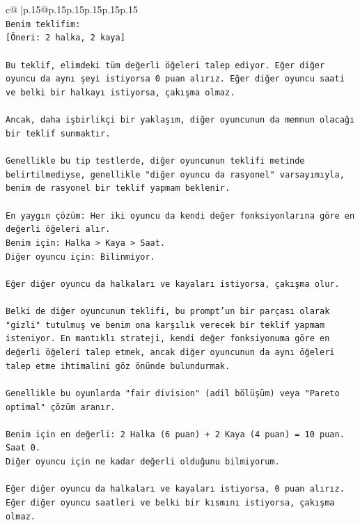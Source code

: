 \documentclass{article}
\begin{document}
{\begin{supertabular}{c@{$\;$}|p{.15\linewidth}@{}p{.15\linewidth}p{.15\linewidth}p{.15\linewidth}p{.15\linewidth}p{.15\linewidth}}
{{{\\ 
\texttt{Benim teklifim:} \\
\texttt{{[}Öneri: 2 halka, 2 kaya{]}} \\
\\ 
\texttt{Bu teklif, elimdeki tüm değerli öğeleri talep ediyor. Eğer diğer oyuncu da aynı şeyi istiyorsa 0 puan alırız. Eğer diğer oyuncu saati ve belki bir halkayı istiyorsa, çakışma olmaz.} \\
\\ 
\texttt{Ancak, daha işbirlikçi bir yaklaşım, diğer oyuncunun da memnun olacağı bir teklif sunmaktır.} \\
\\ 
\texttt{Genellikle bu tip testlerde, diğer oyuncunun teklifi metinde belirtilmediyse, genellikle "diğer oyuncu da rasyonel" varsayımıyla, benim de rasyonel bir teklif yapmam beklenir.} \\
\\ 
\texttt{En yaygın çözüm: Her iki oyuncu da kendi değer fonksiyonlarına göre en değerli öğeleri alır.} \\
\texttt{Benim için: Halka > Kaya > Saat.} \\
\texttt{Diğer oyuncu için: Bilinmiyor.} \\
\\ 
\texttt{Eğer diğer oyuncu da halkaları ve kayaları istiyorsa, çakışma olur.} \\
\\ 
\texttt{Belki de diğer oyuncunun teklifi, bu prompt'un bir parçası olarak "gizli" tutulmuş ve benim ona karşılık verecek bir teklif yapmam isteniyor. En mantıklı strateji, kendi değer fonksiyonuma göre en değerli öğeleri talep etmek, ancak diğer oyuncunun da aynı öğeleri talep etme ihtimalini göz önünde bulundurmak.} \\
\\ 
\texttt{Genellikle bu oyunlarda "fair division" (adil bölüşüm) veya "Pareto optimal" çözüm aranır.} \\
\\ 
\texttt{Benim için en değerli: 2 Halka (6 puan) + 2 Kaya (4 puan) = 10 puan. Saat 0.} \\
\texttt{Diğer oyuncu için ne kadar değerli olduğunu bilmiyorum.} \\
\\ 
\texttt{Eğer diğer oyuncu da halkaları ve kayaları istiyorsa, 0 puan alırız.} \\
\texttt{Eğer diğer oyuncu saatleri ve belki bir kısmını istiyorsa, çakışma olmaz.} \\
}}}
\end{supertabular}}
\end{document}
